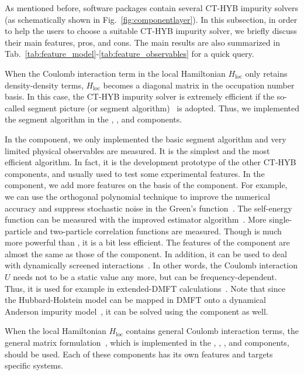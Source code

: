 As mentioned before, {\iqist} software packages contain several CT-HYB impurity solvers (as schematically shown in Fig.~\ref{fig:componentlayer}). In this subsection, in order to help the users to choose a suitable CT-HYB impurity solver, we briefly discuss their main features, pros, and cons. The main results are also summarized in Tab.~\ref{tab:feature_model}-\ref{tab:feature_observables} for a quick query.

When the Coulomb interaction term in the local Hamiltonian $H_{\text{loc}}$ only retains density-density terms, $H_{\text{loc}}$ becomes a diagonal matrix in the occupation number basis. In this case, the CT-HYB impurity solver is extremely efficient if the so-called segment picture (or segment algorithm)~\cite{PhysRevLett.97.076405,RevModPhys.83.349} is adopted. Thus, we implemented the segment algorithm in the {\azalea}, {\gardenia}, and {\narcissus} components.

In the {\azalea} component, we only implemented the basic segment algorithm and very limited physical observables are measured. It is the simplest and the most efficient algorithm. In fact, it is the development prototype of the other CT-HYB components, and usually used to test some experimental features. In the {\gardenia} component, we add more features on the basis of the {\azalea} component. For example, we can use the orthogonal polynomial technique to improve the numerical accuracy and suppress stochastic noise in the Green's function~\cite{PhysRevB.84.075145}. The self-energy function can be measured with the improved estimator algorithm~\cite{PhysRevB.89.235128,PhysRevB.85.205106}. More single-particle and two-particle correlation functions are measured. Though {\gardenia} is much more powerful than {\azalea}, it is a bit less efficient. The features of the {\narcissus} component are almost the same as those of the {\gardenia} component. In addition, it can be used to deal with dynamically screened interactions~\cite{PhysRevLett.104.146401,Werner2012}. In other words, the Coulomb interaction $U$ needs not to be a static value any more, but can be frequency-dependent. Thus, it is used for example in extended-DMFT calculations~\cite{PhysRevB.87.125149}. Note that since the Hubbard-Holstein model can be mapped in DMFT onto a dynamical Anderson impurity model~\cite{PhysRevLett.99.146404}, it can be solved using the {\narcissus} component as well.

When the local Hamiltonian $H_{\text{loc}}$ contains general Coulomb interaction terms, the general matrix formulation~\cite{PhysRevB.74.155107,PhysRevB.75.155113}, which is implemented in the {\begonia}, {\lavender}, {\pansy}, and {\manjushaka} components, should be used. Each of these components has its own features and targets specific systems.

